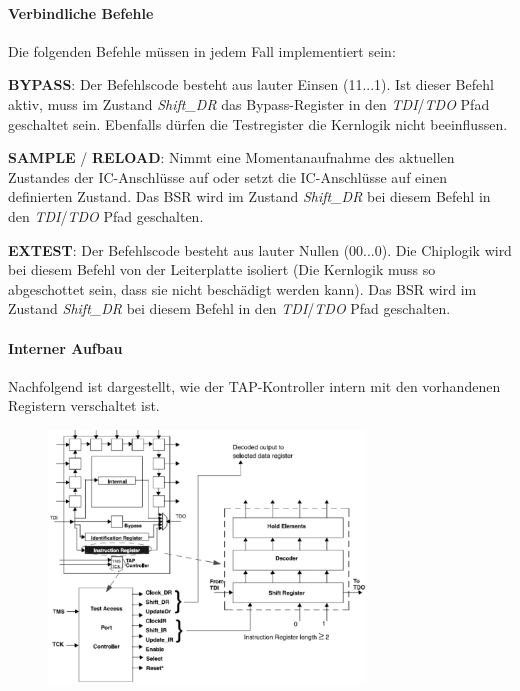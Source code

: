 \paragraph{Verbindliche Befehle}
Die folgenden Befehle müssen in jedem Fall implementiert sein:
\begin{compactitem}
    \item \textbf{BYPASS}: Der Befehlscode besteht aus lauter Einsen (11...1). Ist dieser Befehl aktiv, muss im Zustand \textit{Shift\_DR} das Bypass-Register in den \textit{TDI}/\textit{TDO} Pfad geschaltet sein. Ebenfalls dürfen die Testregister die Kernlogik nicht beeinflussen.
    \item \textbf{SAMPLE} / \textbf{RELOAD}: Nimmt eine Momentanaufnahme des aktuellen Zustandes der IC-Anschlüsse auf oder setzt die IC-Anschlüsse auf einen definierten Zustand. Das BSR wird im Zustand \textit{Shift\_DR} bei diesem Befehl in den \textit{TDI}/\textit{TDO} Pfad geschalten.
    \item \textbf{EXTEST}: Der Befehlscode besteht aus lauter Nullen (00...0). Die Chiplogik wird bei diesem Befehl von der Leiterplatte isoliert (Die Kernlogik muss so abgeschottet sein, dass sie nicht beschädigt werden kann). Das BSR wird im Zustand \textit{Shift\_DR} bei diesem Befehl in den \textit{TDI}/\textit{TDO} Pfad geschalten.
\end{compactitem}

\paragraph{Interner Aufbau}
Nachfolgend ist dargestellt, wie der TAP-Kontroller intern mit den vorhandenen Registern verschaltet ist.
\begin{figure}[H]
    \includegraphics[width=0.75\textwidth]{images/bst_tapkontroller_verschaltung.png}
\end{figure}

